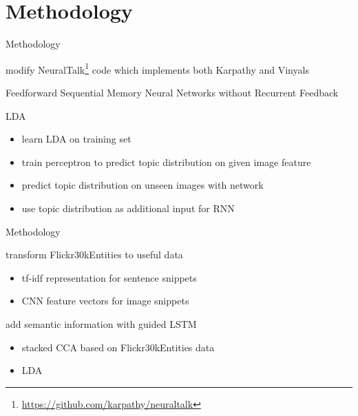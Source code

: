 \documentclass[16pt]{beamer}
\newenvironment{wideitemize}{\itemize\addtolength{\itemsep}{10pt}}{\enditemize}
\begin{document}


\section{Methodology}%

\begin{frame}{Methodology}
\begin{wideitemize}
\item modify NeuralTalk\footnote{\url{https://github.com/karpathy/neuraltalk}} code which implements both Karpathy and Vinyals
\item Feedforward Sequential Memory Neural Networks without Recurrent Feedback \cite{Zhang}
\item LDA
\begin{itemize}
\item learn LDA on training set
\item train perceptron to predict topic distribution on given image feature
\item predict topic distribution on unseen images with network
\item use topic distribution as additional input for RNN
\end{itemize}
\end{wideitemize}
\end{frame}

\begin{frame}{Methodology}
\begin{wideitemize}
\item transform Flickr30kEntities to useful data
\begin{itemize}
\item tf-idf representation for sentence snippets
\item CNN feature vectors for image snippets
\end{itemize}
\item add semantic information with guided LSTM
\begin{itemize}
    \item stacked CCA based on Flickr30kEntities data
    \item LDA
\end{itemize}
\end{wideitemize}
\end{frame}


\end{document}
